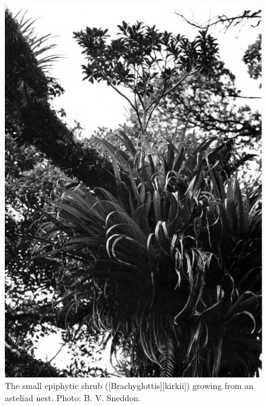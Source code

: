 \begin{figure}[!t]
	\begin{minipage}[t]{\textwidth}
		\begin{minipage}[t]{(\textwidth-\fgap) * \real{0.497}}
			\centering
			\includegraphics[width=\textwidth]{graphics/fig_044}
			\caption[The small epiphytic shrub Kirk's daisy (\emph{Brachyglottis kirkii})]{The small epiphytic shrub  ([Brachyglottis][kirkii]) growing from an asteliad nest.
			Photo: B. V. Sneddon.}%
			\label{fig:44brachyglottis-kirkii}
		\end{minipage}\hspace{\fgap}%
		\begin{minipage}[t]{(\textwidth-\fgap) * \real{0.503}}

\end{minipage}
\end{minipage}
\end{figure}
